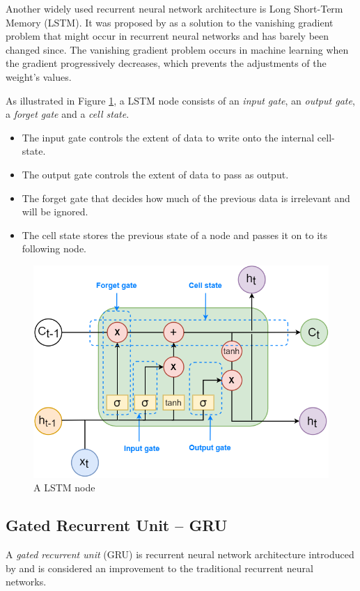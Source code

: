 \documentclass[nofilelist]{cslthse-msc}
\begin{document}
Another widely used recurrent neural network architecture is Long Short-Term Memory (LSTM). It was proposed by \citet{hochreiter1997} as a solution to the vanishing gradient problem that might occur in recurrent neural networks and has barely been changed since. The vanishing gradient problem occurs in machine learning when the gradient progressively decreases, which prevents the adjustments of the weight's values. 


As illustrated in Figure \ref{fig:lstm_node}, a LSTM node consists of an \textit{input gate}, an \textit{output gate}, a \textit{forget gate} and a \textit{cell state}. 
\begin{itemize}
    \item The input gate controls the extent of data to write onto the internal cell-state.
    \item The output gate controls the extent of data to pass as output. 
    \item The forget gate that decides how much of the previous data is irrelevant and will be ignored. 
    \item The cell state stores the previous state of a node and passes it on to its following node. 
\end{itemize}

\begin{figure}[!ht]
    \centering
    \includegraphics[scale=0.5]{msccls/explanatory_images/lstm.png}
    \caption{A LSTM node} 
    \label{fig:lstm_node}
\end{figure}


\subsection{Gated Recurrent Unit -- GRU}
A \emph{gated recurrent unit} (GRU) is recurrent neural network architecture introduced by \citet{cho2014learning} and is considered an improvement to the traditional recurrent neural networks. 
\end{document}
